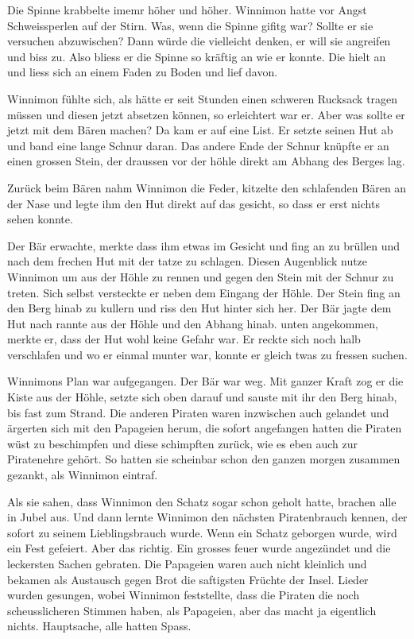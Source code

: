 Die Spinne krabbelte imemr höher und höher. Winnimon hatte vor Angst Schweissperlen auf der Stirn. Was, wenn die Spinne gifitg war? Sollte er sie versuchen abzuwischen? Dann würde die vielleicht denken, er will sie angreifen und biss zu. Also bliess er die Spinne so kräftig an wie er konnte. Die hielt an und liess sich an einem Faden zu Boden und lief davon.

Winnimon fühlte sich, als hätte er seit Stunden einen schweren Rucksack tragen müssen und diesen jetzt absetzen können, so erleichtert war er. Aber was sollte er jetzt mit dem Bären machen? Da kam er auf eine List. Er setzte seinen Hut ab und band eine lange Schnur daran. Das andere Ende der Schnur knüpfte er an einen grossen Stein, der draussen vor der höhle direkt am Abhang des Berges lag.

Zurück beim Bären nahm Winnimon die Feder, kitzelte den schlafenden Bären an der Nase und legte ihm den Hut direkt auf das gesicht, so dass er erst nichts sehen konnte.

Der Bär erwachte, merkte dass ihm etwas im Gesicht und fing an zu brüllen und nach dem frechen Hut mit der tatze zu schlagen. Diesen Augenblick nutze Winnimon um aus der Höhle zu rennen und gegen den Stein mit der Schnur zu treten. Sich selbst versteckte er neben dem Eingang der Höhle. Der Stein fing an den Berg hinab zu kullern und riss den Hut hinter sich her. Der Bär jagte dem Hut nach rannte aus der Höhle und den Abhang hinab. unten angekommen, merkte er, dass der Hut wohl keine Gefahr war. Er reckte sich noch halb verschlafen und wo er einmal munter war, konnte er gleich twas zu fressen suchen.

Winnimons Plan war aufgegangen. Der Bär war weg. Mit ganzer Kraft zog er die Kiste aus der Höhle, setzte sich oben darauf und sauste mit ihr den Berg hinab, bis fast zum Strand. Die anderen Piraten waren inzwischen auch gelandet und ärgerten sich mit den Papageien herum, die sofort angefangen hatten die Piraten wüst zu beschimpfen und diese schimpften zurück, wie es eben auch zur Piratenehre gehört. So hatten sie scheinbar schon den ganzen morgen zusammen gezankt, als Winnimon eintraf.

Als sie sahen, dass Winnimon den Schatz sogar schon geholt hatte, brachen alle in Jubel aus. Und dann lernte Winnimon den nächsten Piratenbrauch kennen, der sofort zu seinem Lieblingsbrauch wurde. Wenn ein Schatz geborgen wurde, wird ein Fest gefeiert. Aber das richtig. Ein grosses feuer wurde angezündet und die leckersten Sachen gebraten. Die Papageien waren auch nicht kleinlich und bekamen als Austausch gegen Brot die saftigsten Früchte der Insel. Lieder wurden gesungen, wobei Winnimon feststellte, dass die Piraten die noch scheusslicheren Stimmen haben, als Papageien, aber das macht ja eigentlich nichts. Hauptsache, alle hatten Spass.


